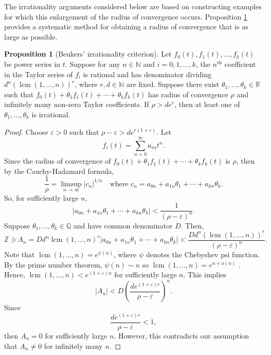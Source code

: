 \documentclass[12pt, a4paper]{amsart}
\theoremstyle{definition}
\numberwithin{theorem}{section}
\newtheorem{proposition}[theorem]{Proposition}
\begin{document}
The irrationality arguments considered below are based on constructing examples for which this enlargement of the radius of convergence occurs. Proposition \ref{prop: Beukers' irrationality criterion} provides a systematic method for obtaining a radius of convergence that is as large as possible.
\begin{proposition}[Beukers' irrationality criterion]\label{prop: Beukers' irrationality criterion}
Let $f_0\left(t\right),f_1\left(t\right),\ldots,f_k\left(t\right)$ be power series in $t$. Suppose for any $n\in\mathbb{N}$ and $i=0,1,\ldots,k$, the $n^\text{th}$ coefficient in the Taylor series of $f_i$ is rational and has denominator dividing $d^n\left(\operatorname{lcm}\left(1,\ldots,n\right)\right)^r$, where $r,d\in\mathbb{N}$ are fixed. Suppose there exist $\theta_1,\ldots,\theta_k\in\mathbb{R}$ such that $f_0\left(t\right)+\theta_1f_1\left(t\right)+\cdots+\theta_kf_k\left(t\right)$ has radius of convergence $\rho$ and infinitely many non-zero Taylor coefficients. If $\rho>de^r$, then at least one of $\theta_1,\ldots,\theta_k$ is irrational.
\end{proposition}
\begin{proof}
Choose $\varepsilon>0$ such that $\rho-\varepsilon>de^{r\left(1+\varepsilon\right)}$. Let \[f_i\left(t\right)=\sum_{n=0}^{\infty}a_{in}t^n.\]
Since the radius of convergence of $f_0\left(t\right)+\theta_1f_1\left(t\right)+\cdots+\theta_kf_k\left(t\right)$ is $\rho$, then by the Cauchy-Hadamard formula,
\[\frac{1}{\rho}=\limsup_{n\to\infty}\left|c_n\right|^{1/n}\quad\text{where }c_n=a_{0n}+a_{1n}\theta_1+\cdots+a_{kn}\theta_k.\]
So, for sufficiently large $n$, \[\left|a_{0n}+a_{1n}\theta_1+\cdots+a_{kn}\theta_k\right|<\frac{1}{\left(\rho-\varepsilon\right)^n}.\]
Suppose $\theta_1,\ldots,\theta_k\in\mathbb{Q}$ and have common denominator $D$. Then, \[\mathbb{Z}\ni A_n=Dd^n\operatorname{lcm}\left(1,\ldots,n\right)^r\left|a_{0n}+a_{1n}\theta_1+\cdots+a_{kn}\theta_k\right|<\frac{Dd^n\left(\operatorname{lcm}\left(1,\ldots,n\right)\right)^r}{\left(\rho-\varepsilon\right)^n}.\]
Note that $\operatorname{lcm}\left(1,\ldots,n\right)=e^{\psi\left(n\right)}$, where $\psi$ denotes the Chebyshev psi function. By the prime number theorem, $\psi\left(n\right)\sim n$ so $\operatorname{lcm}\left(1,\ldots,n\right)=e^{n+o\left(n\right)}$ \cite{Apostol1976}. Hence, $\operatorname{lcm}\left(1,\ldots,n\right)<e^{\left(1+\varepsilon\right)n}$ for sufficiently large $n$. This implies \[\left|A_n\right|<D\left(\frac{de^{\left(1+\varepsilon\right)r}}{\rho-\varepsilon}\right)^n.\]
Since \[\frac{de^{\left(1+\varepsilon\right)r}}{\rho-\varepsilon}<1,\]
then $A_n=0$ for sufficiently large $n$. However, this contradicts our assumption that $A_n\ne 0$ for infinitely many $n$.
\end{proof}
\end{document}
